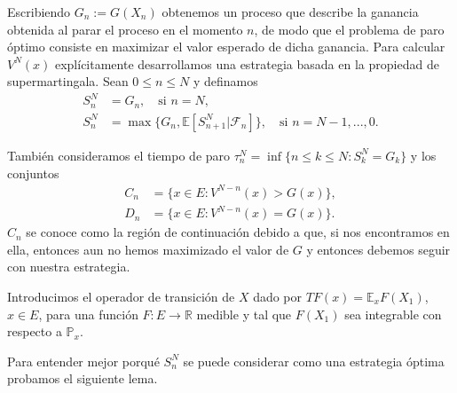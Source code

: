 \documentclass{article}
\numberwithin{equation}{section}
\begin{document}
Escribiendo $G_n := G(X_n)$ obtenemos un proceso que describe la ganancia obtenida al parar el proceso en el momento $n$, de modo que el problema de paro óptimo consiste en maximizar el valor esperado de dicha ganancia. Para calcular $V^N(x)$ explícitamente desarrollamos una estrategia basada en la propiedad de supermartingala. Sean $0\leq n \leq N$ y definamos
\begin{align}
S_n^N &= G_n, \quad \text{si } n=N,\\
S_n^N &= \max\{G_n, \mathbb{E}\left[S^{N}_{n+1}|\mathcal{F}_n\right]\},\quad \text{si } n = N-1,...,0.
\end{align}


También consideramos el tiempo de paro $\tau_n^N = \inf\{n\leq k \leq N : S_k^N = G_k\}$ y los conjuntos
\begin{align}
    C_n &= \{x \in E : V^{N-n}(x) > G(x)\},\\
    D_n &= \{x \in E : V^{N-n}(x) = G(x)\}.
\end{align}
$C_n$ se conoce como la región de continuación debido a que, si nos encontramos en ella, entonces aun no hemos maximizado el valor de $G$ y entonces debemos seguir con nuestra estrategia. 

Introducimos el operador de transición de $X$ dado por $TF(x) = \mathbb{E}_xF(X_1)$, $x \in E$, para una función $F : E \to \mathbb{R}$ medible y tal que $F(X_1)$ sea integrable con respecto a $\mathbb{P}_x$.

Para entender mejor porqué $S_n^N$ se puede considerar como una estrategia óptima probamos el siguiente lema.
\end{document}
